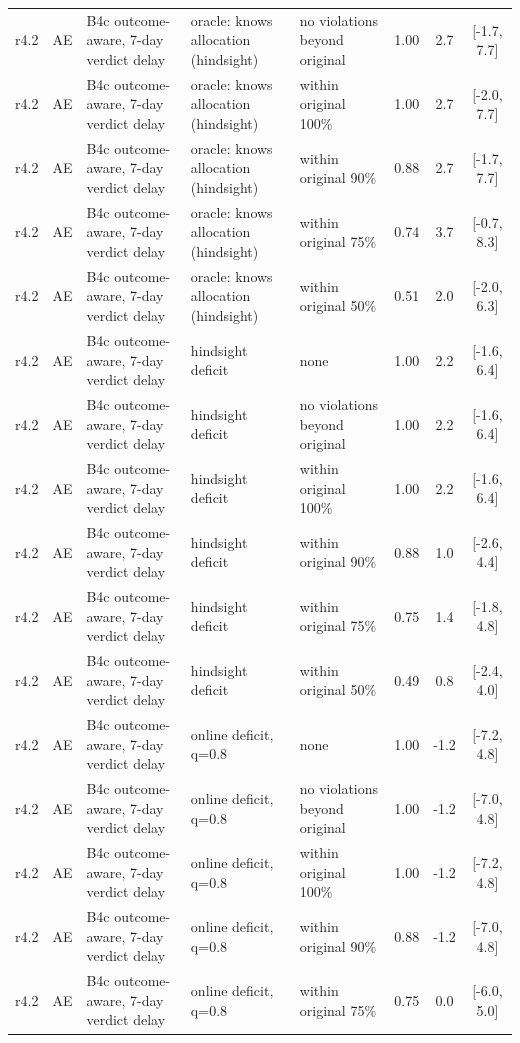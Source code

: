 \documentclass[10pt,onecolumn,letterpaper]{article}
\begin{document}
\begin{longtable}{lllp{4.2cm}p{3.4cm}ccc}
r4.2 & AE & B4c outcome-aware, 7-day verdict delay & oracle: knows allocation (hindsight) & no violations beyond original & 1.00 & 2.7 & [-1.7, 7.7] \\
r4.2 & AE & B4c outcome-aware, 7-day verdict delay & oracle: knows allocation (hindsight) & within original 100\% & 1.00 & 2.7 & [-2.0, 7.7] \\
r4.2 & AE & B4c outcome-aware, 7-day verdict delay & oracle: knows allocation (hindsight) & within original 90\% & 0.88 & 2.7 & [-1.7, 7.7] \\
r4.2 & AE & B4c outcome-aware, 7-day verdict delay & oracle: knows allocation (hindsight) & within original 75\% & 0.74 & 3.7 & [-0.7, 8.3] \\
r4.2 & AE & B4c outcome-aware, 7-day verdict delay & oracle: knows allocation (hindsight) & within original 50\% & 0.51 & 2.0 & [-2.0, 6.3] \\
r4.2 & AE & B4c outcome-aware, 7-day verdict delay & hindsight deficit & none & 1.00 & 2.2 & [-1.6, 6.4] \\
r4.2 & AE & B4c outcome-aware, 7-day verdict delay & hindsight deficit & no violations beyond original & 1.00 & 2.2 & [-1.6, 6.4] \\
r4.2 & AE & B4c outcome-aware, 7-day verdict delay & hindsight deficit & within original 100\% & 1.00 & 2.2 & [-1.6, 6.4] \\
r4.2 & AE & B4c outcome-aware, 7-day verdict delay & hindsight deficit & within original 90\% & 0.88 & 1.0 & [-2.6, 4.4] \\
r4.2 & AE & B4c outcome-aware, 7-day verdict delay & hindsight deficit & within original 75\% & 0.75 & 1.4 & [-1.8, 4.8] \\
r4.2 & AE & B4c outcome-aware, 7-day verdict delay & hindsight deficit & within original 50\% & 0.49 & 0.8 & [-2.4, 4.0] \\
r4.2 & AE & B4c outcome-aware, 7-day verdict delay & online deficit, q=0.8 & none & 1.00 & -1.2 & [-7.2, 4.8] \\
r4.2 & AE & B4c outcome-aware, 7-day verdict delay & online deficit, q=0.8 & no violations beyond original & 1.00 & -1.2 & [-7.0, 4.8] \\
r4.2 & AE & B4c outcome-aware, 7-day verdict delay & online deficit, q=0.8 & within original 100\% & 1.00 & -1.2 & [-7.2, 4.8] \\
r4.2 & AE & B4c outcome-aware, 7-day verdict delay & online deficit, q=0.8 & within original 90\% & 0.88 & -1.2 & [-7.0, 4.8] \\
r4.2 & AE & B4c outcome-aware, 7-day verdict delay & online deficit, q=0.8 & within original 75\% & 0.75 & 0.0 & [-6.0, 5.0] \\

\end{longtable}
\end{document}
